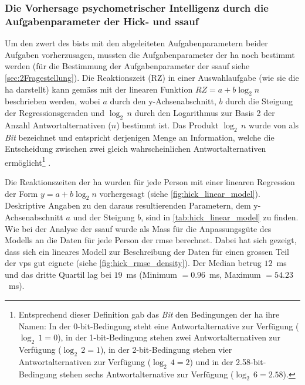 \documentclass[11pt, twoside, a4paper]{book}		%
\begin{document}









\subsubsection*{Die Vorhersage psychometrischer Intelligenz durch die Aufgabenparameter der Hick- und \gls{ssauf}}

Um den \gls{zwert} des \gls{bist}s mit den abgeleiteten Aufgabenparametern beider Aufgaben vorherzusagen, mussten die Aufgabenparameter der \gls{ha} noch bestimmt werden (für die Bestimmung der Aufgabenparameter der \gls{ssauf} siehe \autoref{sec:2Fragestellung}). 
Die Reaktionszeit (RZ) in einer Auswahlaufgabe (wie sie die \gls{ha} darstellt) kann gemäss \citet[S. 105]{Jensen1987a} mit der linearen Funktion $RZ=a+b\log_{2}n$ beschrieben werden, wobei $a$ durch den y-Achsenabschnitt, $b$ durch die Steigung der Regressionsgeraden und $\log_{2}\,n$ durch den Logarithmus zur Basis 2 der Anzahl Antwortalternativen ($n$) bestimmt ist.
Das Produkt $\log_{2}\,n$ wurde von \citet{Hick1952} als \textit{Bit} bezeichnet und entspricht derjenigen Menge an Information, welche die Entscheidung zwischen zwei gleich wahrscheinlichen Antwortalternativen ermöglicht\footnote{Entsprechend dieser Definition gab das \textit{Bit} den Bedingungen der \gls{ha} ihre Namen: In der 0-bit-Bedingung steht eine Antwortalternative zur Verfügung ($\log_{2}\,1=0$), in der 1-bit-Bedingung stehen zwei Antwortalternativen zur Verfügung ($\log_{2}\,2=1$), in der 2-bit-Bedingung stehen vier Antwortalternativen zur Verfügung ($\log_{2}\,4=2$) und in der 2.58-bit-Bedingung stehen sechs Antwortalternative zur Verfügung ($\log_{2}\,6=2.58$).} \citep[siehe auch][S. 27]{Jensen2006}.

Die Reaktionszeiten der \gls{ha} wurden für jede Person mit einer linearen Regression der Form $y=a+b\log_{2}n$  vorhergesagt (siehe \autoref{fig:hick_linear_model}). Deskriptive Angaben zu den daraus resultierenden Parametern, dem y-Achsenabschnitt $a$ und der Steigung $b$, sind in \autoref{tab:hick_linear_model} zu finden. Wie bei der Analyse der \gls{ssauf} wurde als Mass für die Anpassungsgüte des Modells an die Daten für jede Person der \gls{rmse} berechnet. Dabei hat sich gezeigt, dass sich ein lineares Modell zur Beschreibung der Daten für einen grossen Teil der \glspl{vp} gut eignete (siehe \autoref{fig:hick_rmse_density}). Der Median betrug $12$~ms und das dritte Quartil lag bei $19$~ms (Minimum $=0.96$~ms, Maximum $=54.23$~ms).
\end{document}
